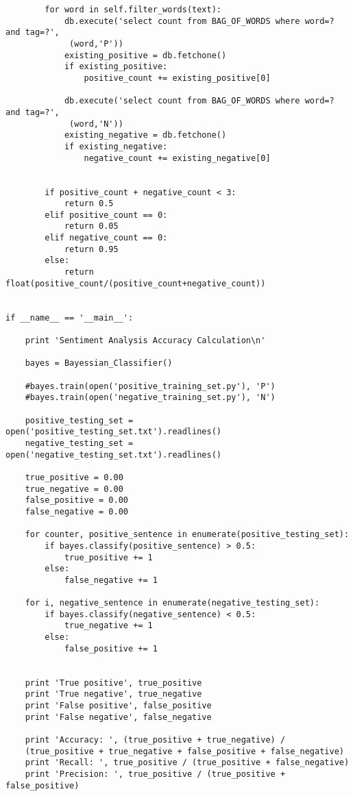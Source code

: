 \documentclass[12pt]{article}
\begin{document}
\begin{verbatim}
        for word in self.filter_words(text):
            db.execute('select count from BAG_OF_WORDS where word=? and tag=?',
             (word,'P'))
            existing_positive = db.fetchone()
            if existing_positive:
                positive_count += existing_positive[0]
                        
            db.execute('select count from BAG_OF_WORDS where word=? and tag=?',
             (word,'N'))
            existing_negative = db.fetchone()
            if existing_negative:
                negative_count += existing_negative[0]

        
        if positive_count + negative_count < 3:
            return 0.5
        elif positive_count == 0:
            return 0.05
        elif negative_count == 0:
            return 0.95
        else:
            return float(positive_count/(positive_count+negative_count))


if __name__ == '__main__':
    
    print 'Sentiment Analysis Accuracy Calculation\n'

    bayes = Bayessian_Classifier()
    
    #bayes.train(open('positive_training_set.py'), 'P')
    #bayes.train(open('negative_training_set.py'), 'N')
    
    positive_testing_set = open('positive_testing_set.txt').readlines()
    negative_testing_set = open('negative_testing_set.txt').readlines()

    true_positive = 0.00
    true_negative = 0.00
    false_positive = 0.00
    false_negative = 0.00

    for counter, positive_sentence in enumerate(positive_testing_set):
        if bayes.classify(positive_sentence) > 0.5:
            true_positive += 1
        else:
            false_negative += 1
    
    for i, negative_sentence in enumerate(negative_testing_set):
        if bayes.classify(negative_sentence) < 0.5:
            true_negative += 1
        else:
            false_positive += 1


    print 'True positive', true_positive
    print 'True negative', true_negative
    print 'False positive', false_positive
    print 'False negative', false_negative

    print 'Accuracy: ', (true_positive + true_negative) / 
    (true_positive + true_negative + false_positive + false_negative)
    print 'Recall: ', true_positive / (true_positive + false_negative)
    print 'Precision: ', true_positive / (true_positive + false_positive)

\end{verbatim}
\end{document}
